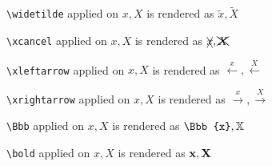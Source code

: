 \texttt{\textbackslash widetilde} applied on $x,X$ is rendered as $\widetilde{x},\widetilde{X}$


\texttt{\textbackslash xcancel} applied on $x,X$ is rendered as $\xcancel{x},\xcancel{X}$


\texttt{\textbackslash xleftarrow} applied on $x,X$ is rendered as $\xleftarrow{x},\xleftarrow{X}$


\texttt{\textbackslash xrightarrow} applied on $x,X$ is rendered as $\xrightarrow{x},\xrightarrow{X}$


\texttt{\textbackslash Bbb} applied on $x,X$ is rendered as $\Bbb{x},\Bbb{X}$


\texttt{\textbackslash bold} applied on $x,X$ is rendered as $\bold{x},\bold{X}$

